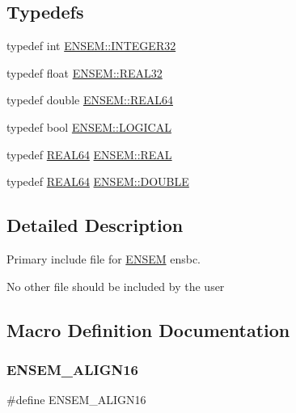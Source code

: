 \subsection*{Typedefs}
\begin{DoxyCompactItemize}
\item 
typedef int \mbox{\hyperlink{namespaceENSEM_a6a58e5c07422c48c5d547184b36719bf}{E\+N\+S\+E\+M\+::\+I\+N\+T\+E\+G\+E\+R32}}
\item 
typedef float \mbox{\hyperlink{namespaceENSEM_a7540d01191172323e9073283d772576d}{E\+N\+S\+E\+M\+::\+R\+E\+A\+L32}}
\item 
typedef double \mbox{\hyperlink{namespaceENSEM_a85b215b9f1f43715aebee01718e25082}{E\+N\+S\+E\+M\+::\+R\+E\+A\+L64}}
\item 
typedef bool \mbox{\hyperlink{namespaceENSEM_ade7c8d5976e979516f8c2ecd223dd0b6}{E\+N\+S\+E\+M\+::\+L\+O\+G\+I\+C\+AL}}
\item 
typedef \mbox{\hyperlink{adat-devel_2lib_2ensem_2ensem__precision_8h_aa31d9c0fbe9c64fbd64dd463f6e63178}{R\+E\+A\+L64}} \mbox{\hyperlink{namespaceENSEM_a6dd9aa6508168f545c861787e63ddd1e}{E\+N\+S\+E\+M\+::\+R\+E\+AL}}
\item 
typedef \mbox{\hyperlink{adat-devel_2lib_2ensem_2ensem__precision_8h_aa31d9c0fbe9c64fbd64dd463f6e63178}{R\+E\+A\+L64}} \mbox{\hyperlink{namespaceENSEM_adcbd0de4e9e0e7ef6aa9b681a554e2c5}{E\+N\+S\+E\+M\+::\+D\+O\+U\+B\+LE}}
\end{DoxyCompactItemize}


\subsection{Detailed Description}
Primary include file for \mbox{\hyperlink{namespaceENSEM}{E\+N\+S\+EM}} ensbc. 

No other file should be included by the user 

\subsection{Macro Definition Documentation}
\mbox{\label{adat-devel_2lib_2ensem_2ensem_8h_a13e73f6d219980e649589b0ce3f31984}} 
\subsubsection{\texorpdfstring{ENSEM\_ALIGN16}{ENSEM\_ALIGN16}}
{\footnotesize\ttfamily \#define E\+N\+S\+E\+M\+\_\+\+A\+L\+I\+G\+N16}

